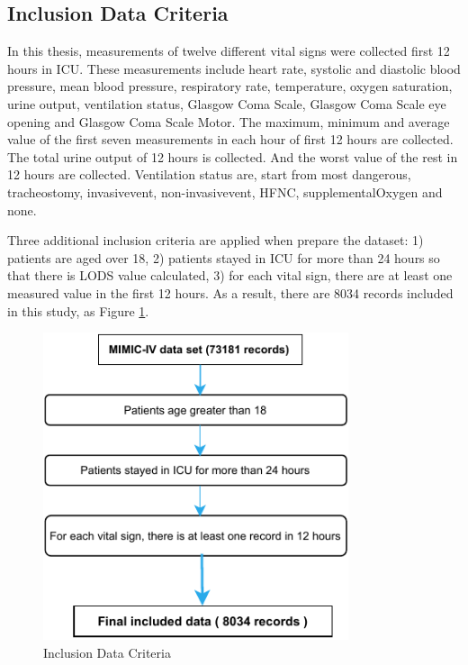 \documentclass[12pt,a4paper,english
]{tunithesis}
\begin{document}
\subsection{Inclusion Data Criteria}
In this thesis, measurements of  twelve different vital signs were collected first 12 hours in ICU. These measurements include heart rate, systolic and diastolic blood pressure, mean blood pressure, respiratory rate, temperature, oxygen saturation, urine output, ventilation status, Glasgow Coma Scale, Glasgow Coma Scale eye opening and Glasgow Coma Scale Motor. The maximum, minimum and average value of the first seven measurements in each hour of first 12 hours are collected. The total urine output of 12 hours is collected. And the worst value of the rest in 12 hours are collected. Ventilation status are, start from most dangerous, tracheostomy, invasivevent, non-invasivevent, HFNC, supplementalOxygen and none.

Three additional inclusion criteria are applied when prepare the dataset: 1) patients are aged over 18, 2) patients stayed in ICU for more than 24 hours so that there is LODS value calculated, 3) for each vital sign, there are at least one measured value in the first 12 hours. As a result, there are 8034 records included in this study, as Figure \ref{fig:include_criteria}.

\begin{figure}
  \begin{center}
    \includegraphics[width=0.8\textwidth]{thesis/img/include_criteria.pdf}
  \end{center}
  \caption[Inclusion Criteria]{Inclusion Data Criteria}
  \label{fig:include_criteria}
\end{figure}
\end{document}
